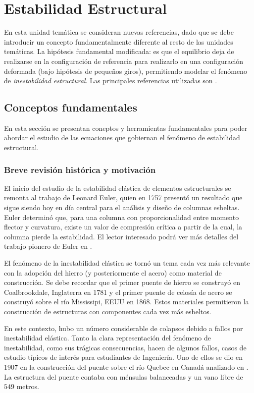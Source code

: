 \chapter{Estabilidad Estructural}

En esta unidad temática se consideran nuevas referencias, dado que se debe introducir un concepto fundamentalmente diferente al resto de las unidades temáticas. %
%
La hipótesis fundamental modificada: es que el equilibrio deja de realizarse en la configuración de referencia para realizarlo en una configuración deformada (bajo hipótesis de pequeños giros), permitiendo modelar el fenómeno de \textit{inestabilidad estructural}. %
%
Las principales referencias utilizadas son \citep{yoo2011,Bazzano2017}. 

\section{Conceptos fundamentales} 

En esta sección se presentan coneptos y herramientas fundamentales para poder abordar el estudio de las ecuaciones que gobiernan el fenómeno de estabilidad estructural.

\subsection{Breve revisión histórica y motivación}

El inicio del estudio de la estabilidad elástica de elementos estructurales se remonta al trabajo de Leonard Euler, quien en 1757 presentó un resultado que sigue siendo hoy en día central para el análisis y diseño de columnas esbeltas. %
%
Euler determinó que, para una columna con proporcionalidad entre momento flector y curvatura, existe un valor de compresión crítica a partir de la cual, la columna pierde la estabilidad. %
%
El lector interesado podrá ver más detalles del trabajo pionero de Euler en \citep{Timoshenko1953}.

El fenómeno de la inestabilidad elástica se tornó un tema cada vez más relevante con la adopción del hierro (y posteriormente el acero) como material de construcción. %
%
Se debe recordar que el primer puente de hierro se construyó en Coalbrookdale, Inglaterra en 1781 y el primer puente de celosía de acero se construyó sobre el río Mississipi, EEUU en 1868.  Estos materiales permitieron la construcción de estructuras con componentes cada vez más esbeltos. 

En este contexto, hubo un número considerable de colapsos debido a fallos por inestabilidad elástica. %
%
Tanto la clara representación del fenómeno de inestabilidad, como sus trágicas consecuencias, hacen de algunos fallos, casos de estudio típicos de interés para estudiantes de Ingeniería. %
%
Uno de ellos se dio en 1907 en la construcción del puente sobre el río Quebec en Canadá analizado en \citep{Brady2014}. %
%
La estructura del puente contaba con ménsulas balanceadas y un vano libre de $549$ metros. %

